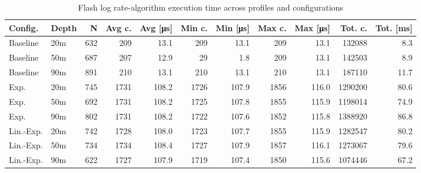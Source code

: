 \begin{table}
\centering
\small
\renewcommand{\arraystretch}{1.15}
\begin{tabular}{llrrrrrrrrr}
\toprule
Config. & Depth & N & Avg c. & Avg [\si{\micro\second}] & Min c. & Min [\si{\micro\second}] & Max c. & Max [\si{\micro\second}] & Tot. c. & Tot. [\si{\milli\second}] \\
\midrule
Baseline & 20m & 632 & 209 & 13.1 & 209 & 13.1 & 209 & 13.1 & 132088 & 8.3 \\
Baseline & 50m & 687 & 207 & 12.9 & 29 & 1.8 & 209 & 13.1 & 142503 & 8.9 \\
Baseline & 90m & 891 & 210 & 13.1 & 210 & 13.1 & 210 & 13.1 & 187110 & 11.7 \\
Exp. & 20m & 745 & 1731 & 108.2 & 1726 & 107.9 & 1856 & 116.0 & 1290200 & 80.6 \\
Exp. & 50m & 692 & 1731 & 108.2 & 1725 & 107.8 & 1855 & 115.9 & 1198014 & 74.9 \\
Exp. & 90m & 802 & 1731 & 108.2 & 1722 & 107.6 & 1852 & 115.8 & 1388920 & 86.8 \\
Lin.-Exp. & 20m & 742 & 1728 & 108.0 & 1723 & 107.7 & 1855 & 115.9 & 1282547 & 80.2 \\
Lin.-Exp. & 50m & 734 & 1734 & 108.4 & 1727 & 107.9 & 1857 & 116.1 & 1273067 & 79.6 \\
Lin.-Exp. & 90m & 622 & 1727 & 107.9 & 1719 & 107.4 & 1850 & 115.6 & 1074446 & 67.2 \\
\bottomrule
\end{tabular}
\caption{Flash log rate-algorithm execution time across profiles and configurations}
\label{tab:timing_flash_log_rate}
\end{table}
